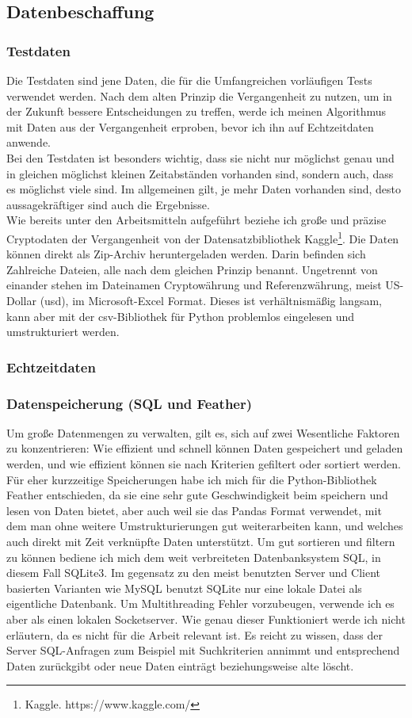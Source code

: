 \documentclass[12pt]{article}
\begin{document}
\subsection{Datenbeschaffung}
	\subsubsection{Testdaten}
		Die Testdaten sind jene Daten, die für die Umfangreichen vorläufigen Tests verwendet werden. Nach dem alten Prinzip die Vergangenheit zu nutzen, um in der Zukunft bessere Entscheidungen zu treffen, werde ich meinen Algorithmus mit Daten aus der Vergangenheit erproben, bevor ich ihn auf Echtzeitdaten anwende.\\
		Bei den Testdaten ist besonders wichtig, dass sie nicht nur möglichst genau und in gleichen möglichst kleinen Zeitabständen vorhanden sind, sondern auch, dass es möglichst viele sind. Im allgemeinen gilt, je mehr Daten vorhanden sind, desto aussagekräftiger sind auch die Ergebnisse.\\
		Wie bereits unter den Arbeitsmitteln aufgeführt beziehe ich große und präzise Cryptodaten der Vergangenheit von der Datensatzbibliothek Kaggle\footnote{Kaggle. https://www.kaggle.com/}. Die Daten können direkt als Zip-Archiv heruntergeladen werden. Darin befinden sich Zahlreiche Dateien, alle nach dem gleichen Prinzip benannt. Ungetrennt von einander stehen im Dateinamen Cryptowährung und Referenzwährung, meist US-Dollar (usd), im Microsoft-Excel Format. Dieses ist verhältnismäßig langsam, kann aber mit der csv-Bibliothek für Python problemlos eingelesen und umstrukturiert werden.
	\subsubsection{Echtzeitdaten}
	\subsubsection{Datenspeicherung (SQL und Feather)}
		Um große Datenmengen zu verwalten, gilt es, sich auf zwei Wesentliche Faktoren zu konzentrieren: Wie effizient und schnell können Daten gespeichert und geladen werden, und wie effizient können sie nach Kriterien gefiltert oder sortiert werden. Für eher kurzzeitige Speicherungen habe ich mich für die Python-Bibliothek Feather entschieden, da sie eine sehr gute Geschwindigkeit beim speichern und lesen von Daten bietet, aber auch weil sie das Pandas Format verwendet, mit dem man ohne weitere Umstrukturierungen gut weiterarbeiten kann, und welches auch direkt mit Zeit verknüpfte Daten unterstützt. Um gut sortieren und filtern zu können bediene ich mich dem weit verbreiteten Datenbanksystem SQL, in diesem Fall SQLite3. Im gegensatz zu den meist benutzten Server und Client basierten Varianten wie MySQL benutzt SQLite nur eine lokale Datei als eigentliche Datenbank. Um Multithreading Fehler vorzubeugen, verwende ich es aber als einen lokalen Socketserver. Wie genau dieser Funktioniert werde ich nicht erläutern, da es nicht für die Arbeit relevant ist. Es reicht zu wissen, dass der Server SQL-Anfragen zum Beispiel mit Suchkriterien annimmt und entsprechend Daten zurückgibt oder neue Daten einträgt beziehungsweise alte löscht.
\end{document}
